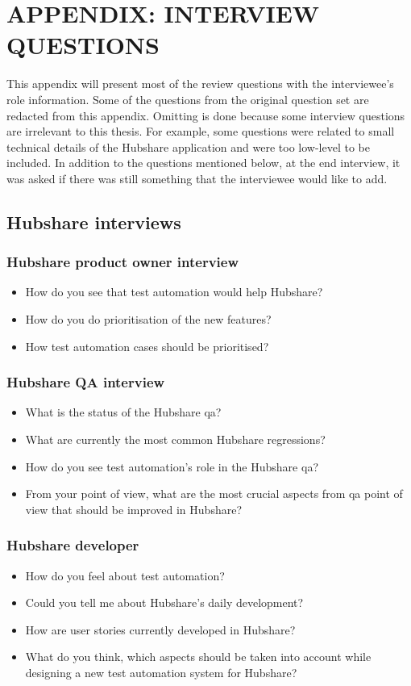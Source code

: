 \chapter{APPENDIX: INTERVIEW QUESTIONS}\label{appendix:interview_questions}
This appendix will present most of the review questions with the interviewee's role information. Some of the questions from the original question set are redacted from this appendix. Omitting is done because some interview questions are irrelevant to this thesis. For example, some questions were related to small technical details of the Hubshare application and were too low-level to be included. In addition to the questions mentioned below, at the end interview, it was asked if there was still something that the interviewee would like to add.

\section{Hubshare interviews}

\subsection*{Hubshare product owner interview}
\begin{itemize}[noitemsep]
	\item How do you see that test automation would help Hubshare?
	\item How do you do prioritisation of the new features?
	\item How test automation cases should be prioritised?
\end{itemize}

\subsection*{Hubshare QA interview}
\begin{itemize}[noitemsep]
	\item What is the status of the Hubshare \gls{qa}?
	\item What are currently the most common Hubshare regressions?
	\item How do you see test automation's role in the Hubshare \gls{qa}?
	\item From your point of view, what are the most crucial aspects from \gls{qa} point of view that should be improved in Hubshare?
\end{itemize}

\subsection*{Hubshare developer}
\begin{itemize}[noitemsep]
	\item How do you feel about test automation?
	\item Could you tell me about Hubshare's daily development?
	\item How are user stories currently developed in Hubshare?
	\item What do you think, which aspects should be taken into account while designing a new test automation system for Hubshare?
\end{itemize}

